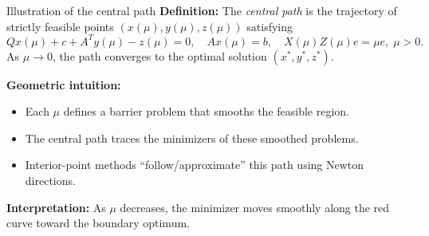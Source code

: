 \begin{frame}{Illustration of the central path}
\textbf{Definition:} The \emph{central path} is the trajectory of strictly feasible points $(x(\mu), y(\mu), z(\mu))$ satisfying
\[
Qx(\mu) + c + A^T y(\mu) - z(\mu) = 0, \quad Ax(\mu) = b, \quad X(\mu) Z(\mu)e = \mu e,\; \mu>0.
\]
As $\mu \to 0$, the path converges to the optimal solution $(x^*,y^*,z^*)$.

\vspace{2mm}
\textbf{Geometric intuition:}
\begin{itemize}
  \item Each $\mu$ defines a barrier problem that smooths the feasible region.
  \item The central path traces the minimizers of these smoothed problems.
  \item Interior-point methods ``follow/approximate'' this path using Newton directions.
\end{itemize}


\vspace{1mm}
\textbf{Interpretation:} As $\mu$ decreases, the minimizer moves smoothly along the red curve toward the boundary optimum.
\end{frame}

